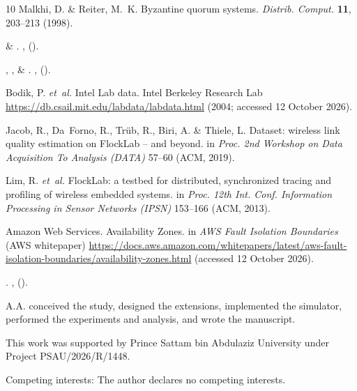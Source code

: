 \documentclass[lineno,pdflatex,sn-nature]{sn-jnl}
\theoremstyle{thmstyleone}%
\theoremstyle{thmstylethree}%
\begin{document}
\begin{thebibliography}{10}
Malkhi, D. \& Reiter, M.~K. {Byzantine} quorum systems. \emph{Distrib. Comput.} \textbf{11}, 203--213 (1998).

 \& 
\newblock {}.
\newblock \emph{}
  \textbf{}, 
  ().

, ,
   \& 
\newblock {}.
\newblock \emph{}
  \textbf{}, 
  ().

Bodik, P. \emph{et~al.} Intel Lab data. Intel Berkeley Research Lab \url{https://db.csail.mit.edu/labdata/labdata.html} (2004; accessed 12 October 2026).

Jacob, R., Da~Forno, R., Tr{\"u}b, R., Biri, A. \& Thiele, L. Dataset: wireless link quality estimation on {FlockLab} -- and beyond. in \emph{Proc. 2nd Workshop on Data Acquisition To Analysis (DATA)} 57--60 (ACM, 2019).

Lim, R. \emph{et~al.} {FlockLab}: a testbed for distributed, synchronized tracing and profiling of wireless embedded systems. in \emph{Proc. 12th Int. Conf. Information Processing in Sensor Networks (IPSN)} 153--166 (ACM, 2013).

Amazon Web Services. Availability Zones. in \emph{AWS Fault Isolation Boundaries} (AWS whitepaper) \url{https://docs.aws.amazon.com/whitepapers/latest/aws-fault-isolation-boundaries/availability-zones.html} (accessed 12 October 2026).

\newblock {}.
\newblock \emph{} \textbf{},
   ().

\end{thebibliography}



A.A. conceived the study, designed the extensions, implemented the simulator,
performed the experiments and analysis, and wrote the manuscript.


This work was supported by Prince Sattam bin Abdulaziz University under
Project PSAU/2026/R/1448.


{Competing interests:} The author declares no competing interests.
\end{document}
